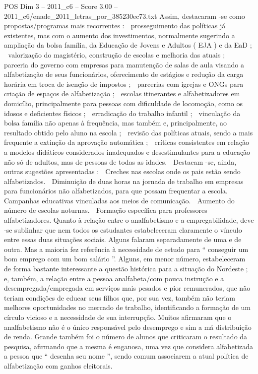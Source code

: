 \begin{textsample}{POS Dim 3 – 2011\_c6 – Score 3.00 – 2011\_c6/enade\_2011\_letras\_por\_385230ec73.txt}
Assim, destacaram -se como propostas/programas mais recorrentes :  prosseguimento das políticas já existentes, mas com o aumento dos investimentos, normalmente sugerindo a ampliação da bolsa família, da Educação de Jovens e Adultos ( EJA ) e da EaD ;  valorização do magistério, construção de escolas e melhoria das atuais ;  parceria do governo com empresas para manutenção de salas de aula visando a alfabetização de seus funcionários, oferecimento de estágios e redução da carga horária em troca de isenção de impostos ;  parcerias com igrejas e ONGs para criação de espaços de alfabetização ;  escolas itinerantes e alfabetizadores em domicílio, principalmente para pessoas com dificuldade de locomoção, como os idosos e deficientes físicos ;  erradicação do trabalho infantil ;  vinculação da bolsa família não apenas à frequência, mas também e, principalmente, ao resultado obtido pelo aluno na escola ;  revisão das políticas atuais, sendo a mais frequente a extinção da aprovação automática ;  críticas consistentes em relação a modelos didáticos considerados inadequados e desestimulantes para a educação não só de adultos, mas de pessoas de todas as idades.  Destacam -se, ainda, outras sugestões apresentadas :  Creches nas escolas onde os pais estão sendo alfabetizados.  Diminuição de duas horas na jornada de trabalho em empresas para funcionários não alfabetizados, para que possam frequentar a escola.  Campanhas educativas vinculadas aos meios de comunicação.  Aumento do número de escolas noturnas.  Formação específica para professores alfabetizadores.
Quanto à relação entre o analfabetismo e a empregabilidade, deve -se sublinhar que nem todos os estudantes estabeleceram claramente o vínculo entre essas duas situações sociais.
Alguns falaram separadamente de uma e de outra.
Mas a maioria fez referência à necessidade de estudo para “ conseguir um bom emprego com um bom salário ”.
Alguns, em menor número, estabeleceram de forma bastante interessante a questão histórica para a situação do Nordeste ; e, também, a relação entre a pessoa analfabeta/com pouca instrução e a desempregada/empregada em serviços mais pesados e pior remunerados, que não teriam condições de educar seus filhos que, por sua vez, também não teriam melhores oportunidades no mercado de trabalho, identificando a formação de um círculo vicioso e a necessidade de sua interrupção.
Muitos afirmaram que o analfabetismo não é o único responsável pelo desemprego e sim a má distribuição de renda.
Grande também foi o número de alunos que criticaram o resultado da pesquisa, afirmando que a mesma é enganosa, uma vez que considera alfabetizada a pessoa que “ desenha seu nome ”, sendo comum associarem a atual política de alfabetização com ganhos eleitorais.

\end{textsample}

